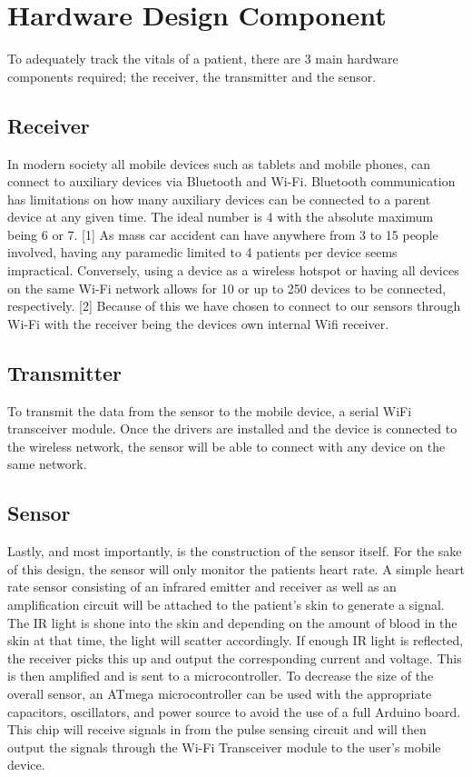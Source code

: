
\section{Hardware Design Component}

To adequately track the vitals of a patient, there are 3 main hardware components required; the receiver, the transmitter and the sensor.

\subsection{Receiver}
In modern society all mobile devices such as tablets and mobile phones, can connect to auxiliary devices via Bluetooth and Wi-Fi. Bluetooth communication has limitations on how many auxiliary devices can be connected to a parent device at any given time. The ideal number is 4 with the absolute maximum being 6 or 7. [1] As mass car accident can have anywhere from 3 to 15 people involved, having any paramedic limited to 4 patients per device seems impractical. Conversely, using a device as a wireless hotspot or having all devices on the same Wi-Fi network allows for 10 or up to 250 devices to be connected, respectively. [2] Because of this we have chosen to connect to our sensors through Wi-Fi with the receiver being the devices own internal Wifi receiver.

\subsection{Transmitter}
To transmit the data from the sensor to the mobile device, a serial WiFi transceiver module. Once the drivers are installed and the device is connected to the wireless network, the sensor will be able to connect with any device on the same network.

\subsection{Sensor}
Lastly, and most importantly, is the construction of the sensor itself. For the sake of this design, the sensor will only monitor the patients heart rate. A simple heart rate sensor consisting of an infrared emitter and receiver as well as an amplification circuit will be attached to the patient’s skin to generate a signal. The IR light is shone into the skin and depending on the amount of blood in the skin at that time, the light will scatter accordingly. If enough IR light is reflected, the receiver picks this up and output the corresponding current and voltage. This is then amplified and is sent to a microcontroller.
To decrease the size of the overall sensor, an ATmega microcontroller can be used with the appropriate capacitors, oscillators, and power source to avoid the use of a full Arduino board. This chip will receive signals in from the pulse sensing circuit and will then output the signals through the Wi-Fi Transceiver module to the user’s mobile device.
